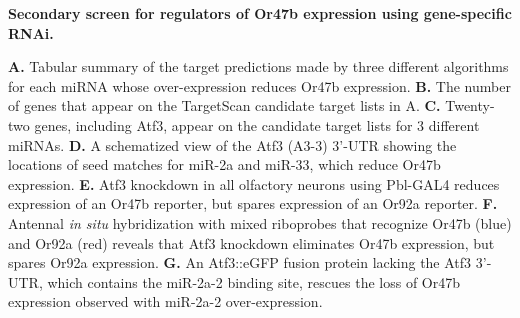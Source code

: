 {\bf Secondary screen for regulators of Or47b expression using gene-specific RNAi.}

\textbf{A.} Tabular summary of the target predictions made by three different algorithms for each miRNA whose over-expression reduces Or47b expression.
\textbf{B.} The number of genes that appear on the TargetScan candidate target lists in A.
\textbf{C.} Twenty-two genes, including Atf3, appear on the candidate target lists for 3 different miRNAs.
\textbf{D.} A schematized view of the Atf3 (A3-3) 3'-UTR showing the locations of seed matches for miR-2a and miR-33, which reduce Or47b expression.
\textbf{E.} Atf3 knockdown in all olfactory neurons using Pbl-GAL4 reduces expression of an Or47b reporter, but spares expression of an Or92a reporter.
\textbf{F.} Antennal \emph{in situ} hybridization with mixed riboprobes that recognize Or47b (blue) and Or92a (red) reveals that Atf3 knockdown eliminates Or47b expression, but spares Or92a expression.
\textbf{G.} An Atf3::eGFP fusion protein lacking the Atf3 3'-UTR, which contains the miR-2a-2 binding site, rescues the loss of Or47b expression observed with miR-2a-2 over-expression.
\label{fig:2}